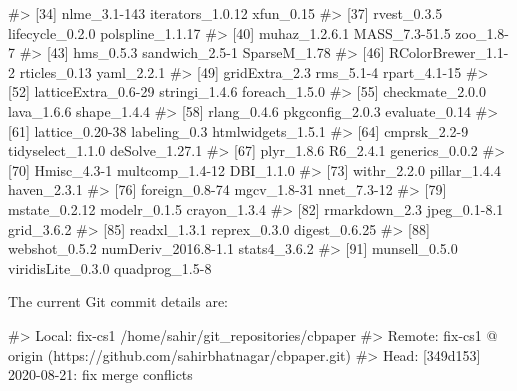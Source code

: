 \documentclass[
]{jss}
\begin{document}
\begin{CodeChunk}
\begin{CodeOutput}
#> [34] nlme_3.1-143        iterators_1.0.12    xfun_0.15          
#> [37] rvest_0.3.5         lifecycle_0.2.0     polspline_1.1.17   
#> [40] muhaz_1.2.6.1       MASS_7.3-51.5       zoo_1.8-7          
#> [43] hms_0.5.3           sandwich_2.5-1      SparseM_1.78       
#> [46] RColorBrewer_1.1-2  rticles_0.13        yaml_2.2.1         
#> [49] gridExtra_2.3       rms_5.1-4           rpart_4.1-15       
#> [52] latticeExtra_0.6-29 stringi_1.4.6       foreach_1.5.0      
#> [55] checkmate_2.0.0     lava_1.6.6          shape_1.4.4        
#> [58] rlang_0.4.6         pkgconfig_2.0.3     evaluate_0.14      
#> [61] lattice_0.20-38     labeling_0.3        htmlwidgets_1.5.1  
#> [64] cmprsk_2.2-9        tidyselect_1.1.0    deSolve_1.27.1     
#> [67] plyr_1.8.6          R6_2.4.1            generics_0.0.2     
#> [70] Hmisc_4.3-1         multcomp_1.4-12     DBI_1.1.0          
#> [73] withr_2.2.0         pillar_1.4.4        haven_2.3.1        
#> [76] foreign_0.8-74      mgcv_1.8-31         nnet_7.3-12        
#> [79] mstate_0.2.12       modelr_0.1.5        crayon_1.3.4       
#> [82] rmarkdown_2.3       jpeg_0.1-8.1        grid_3.6.2         
#> [85] readxl_1.3.1        reprex_0.3.0        digest_0.6.25      
#> [88] webshot_0.5.2       numDeriv_2016.8-1.1 stats4_3.6.2       
#> [91] munsell_0.5.0       viridisLite_0.3.0   quadprog_1.5-8
\end{CodeOutput}
\end{CodeChunk}

The current Git commit details are:

\begin{CodeChunk}

\begin{CodeOutput}
#> Local:    fix-cs1 /home/sahir/git_repositories/cbpaper
#> Remote:   fix-cs1 @ origin (https://github.com/sahirbhatnagar/cbpaper.git)
#> Head:     [349d153] 2020-08-21: fix merge conflicts
\end{CodeOutput}
\end{CodeChunk}


\end{document}
